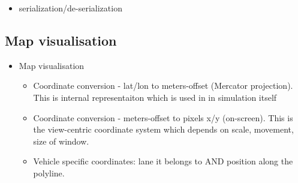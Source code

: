 \begin{itemize}
	\item serialization/de-serialization
\end{itemize}


\subsection{Map visualisation}
\begin{itemize}
    \item Map visualisation
    \begin{itemize}
        \item Coordinate conversion - lat/lon to meters-offset (Mercator projection). This is internal representaiton which is used in in simulation itself
        \item Coordinate conversion - meters-offset to pixels x/y (on-screen). This is the view-centric coordinate system which depends on scale, movement, size of window.
        \item Vehicle specific coordinates: lane it belongs to AND position along the polyline.
    \end{itemize}
\end{itemize}

